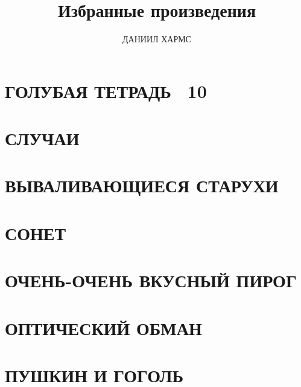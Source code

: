 \documentclass[12pt]{book}
\title{Избранные произведения}
\author{ДАНИИЛ ХАРМС}
\date{}
\begin{document}
\maketitle

\chapter{ГОЛУБАЯ ТЕТРАДЬ \textnumero~10}


\chapter{СЛУЧАИ}


\chapter{ВЫВАЛИВАЮЩИЕСЯ СТАРУХИ}


\chapter{СОНЕТ}


\chapter{ОЧЕНЬ-ОЧЕНЬ ВКУСНЫЙ ПИРОГ}


\chapter{ОПТИЧЕСКИЙ ОБМАН}


\chapter{ПУШКИН И ГОГОЛЬ}

\end{document}
